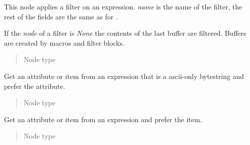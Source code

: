 \documentclass[a4paper,10pt,english]{sphinxmanual}
\begin{document}
\begin{fulllineitems}
\label{extensions:jinja2.nodes.Filter}
This node applies a filter on an expression.  \emph{name} is the name of
the filter, the rest of the fields are the same as for {\hyperref[extensions:jinja2.nodes.Call]{}}.

If the \emph{node} of a filter is \emph{None} the contents of the last buffer are
filtered.  Buffers are created by macros and filter blocks.
\begin{quote}\begin{description}
\item[{Node type}] \leavevmode
{\hyperref[extensions:jinja2.nodes.Expr]{}}

\end{description}\end{quote}

\end{fulllineitems}


\begin{fulllineitems}
\label{extensions:jinja2.nodes.Getattr}
Get an attribute or item from an expression that is a ascii-only
bytestring and prefer the attribute.
\begin{quote}\begin{description}
\item[{Node type}] \leavevmode
{\hyperref[extensions:jinja2.nodes.Expr]{}}

\end{description}\end{quote}

\end{fulllineitems}


\begin{fulllineitems}
\label{extensions:jinja2.nodes.Getitem}
Get an attribute or item from an expression and prefer the item.
\begin{quote}\begin{description}
\item[{Node type}] \leavevmode
{\hyperref[extensions:jinja2.nodes.Expr]{}}

\end{description}\end{quote}

\end{fulllineitems}
\end{document}
